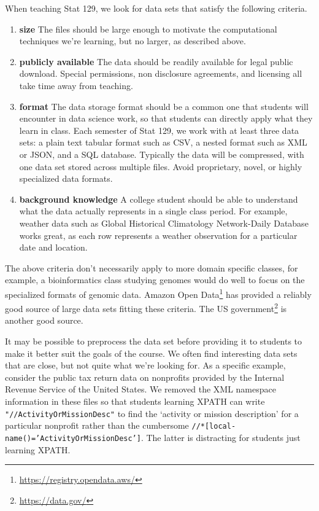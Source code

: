 \documentclass[12pt]{article}
\begin{document}
When teaching Stat 129, we look for data sets that satisfy the following criteria.
\begin{enumerate}
\item \textbf{size} The files should be large enough to motivate the computational techniques we're learning, but no larger, as described above.
\item \textbf{publicly available} The data should be readily available for legal public download.
	Special permissions, non disclosure agreements, and licensing all take time away from teaching.
\item \textbf{format} 
    The data storage format should be a common one that students will encounter in data science work, so that students can directly apply what they learn in class.
    Each semester of Stat 129, we work with at least three data sets: a plain text tabular format such as CSV, a nested format such as XML or JSON, and a SQL database.
    Typically the data will be compressed, with one data set stored across multiple files.
	Avoid proprietary, novel, or highly specialized data formats.
\item \textbf{background knowledge}
    A college student should be able to understand what the data actually represents in a single class period.
    For example, weather data such as Global Historical Climatology Network-Daily Database \cite{menne2012overview} works great, as each row represents a weather observation for a particular date and location.
\end{enumerate}
The above criteria don't necessarily apply to more domain specific classes, for example, a bioinformatics class studying genomes would do well to focus on the specialized formats of genomic data.
Amazon Open Data\footnote{\url{https://registry.opendata.aws/}} has provided a reliably good source of large data sets fitting these criteria. 
The US government\footnote{\url{https://data.gov/}} is another good source.

It may be possible to preprocess the data set before providing it to students to make it better suit the goals of the course.
We often find interesting data sets that are close, but not quite what we're looking for.
As a specific example, consider the public tax return data on nonprofits provided by the Internal Revenue Service of the United States\cite{irs990}.
We removed the XML namespace information in these files so that students learning XPATH can write \texttt{"//ActivityOrMissionDesc"} to find the `activity or mission description' for a particular nonprofit rather than the cumbersome \texttt{//*[local-name()='ActivityOrMissionDesc']}.
The latter is distracting for students just learning XPATH.
\end{document}
